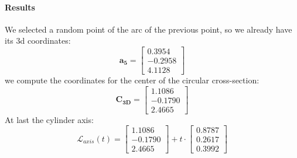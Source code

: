 \documentclass[a4paper,11pt]{article}
\newcommand{\vect}[1]{\mathbf{#1}}  %
\begin{document}
\paragraph{Results}
We selected a random point of the arc of the previous point, so we already have its 3d coordinates:
\[
\vect{a_5}  = \begin{bmatrix}
    0.3954 \\
    -0.2958 \\
    4.1128
\end{bmatrix}
\]
we compute the coordinates  for the center of the circular cross-section:
\[
\vect{C_{3D}} = 
\begin{bmatrix}
    1.1086 \\
    -0.1790 \\
    2.4665
\end{bmatrix}
\]
At last the cylinder axis:
\[\mathcal{L}_{axis}(t) = \begin{bmatrix}
    1.1086 \\
    -0.1790 \\
    2.4665
\end{bmatrix} + t \cdot \begin{bmatrix}
    0.8787 \\
    0.2617 \\
    0.3992
\end{bmatrix}\]
\end{document}
